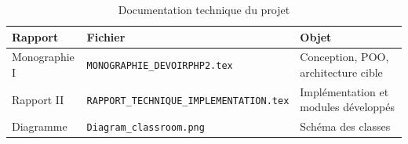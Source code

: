 \documentclass[12pt,a4paper]{article}
\begin{document}
\begin{table}[h]
\centering
\small
\begin{tabular}{|l|l|l|}
\hline
\textbf{Rapport} & \textbf{Fichier} & \textbf{Objet} \\
\hline
Monographie I & \texttt{MONOGRAPHIE\_DEVOIRPHP2.tex} & Conception, POO, architecture cible \\
\hline
Rapport II & \texttt{RAPPORT\_TECHNIQUE\_IMPLEMENTATION.tex} & Implémentation et modules développés \\
\hline
Diagramme & \texttt{Diagram\_classroom.png} & Schéma des classes \\
\hline
\end{tabular}
\caption{Documentation technique du projet}
\end{table}
\end{document}
